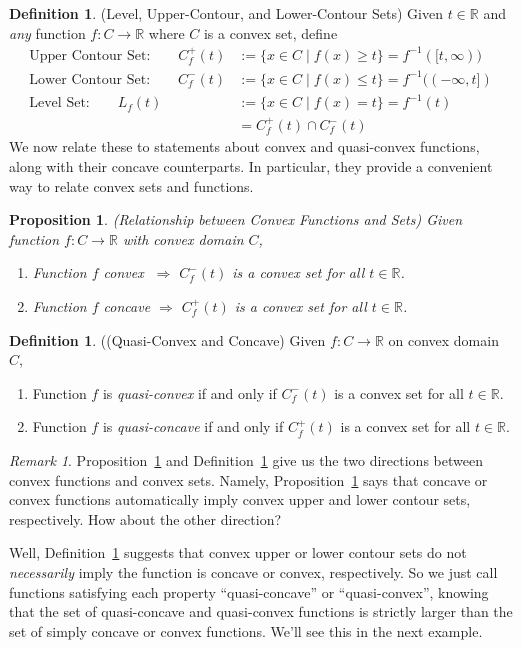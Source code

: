 \documentclass[12pt]{article}
\numberwithin{equation}{section} %
\theoremstyle{plain}
\newtheorem{prop}[thm]{Proposition}
\theoremstyle{definition}
\newtheorem{defn}[thm]{Definition}
\theoremstyle{remark}
\newtheorem*{rmk}{Remark}
\newcommand{\R}{\mathbb{R}}
\begin{document}
\begin{defn}{(Level, Upper-Contour, and Lower-Contour Sets)}
Given $t\in\R$ and \emph{any} function $f:C\rightarrow \R$ where $C$ is
a convex set, define
\begin{align*}
  \text{Upper Contour Set:}
  \qquad C_f^+(t)
  &:= \{ x\in C \; | \; f(x) \geq t\} = f^{-1}([t,\infty)) \\
  \text{Lower Contour Set:}
  \qquad C_f^-(t)
  &:= \{ x\in C \; | \; f(x) \leq t\} = f^{-1}((-\infty,t]) \\
  \text{Level Set:}
  \qquad L_f(t) \;
  &:= \{ x\in C \; | \; f(x) = t\} = f^{-1}(t) \\
  &= C^+_f(t) \cap C^-_f(t)
\end{align*}
We now relate these to statements about convex and quasi-convex
functions, along with their concave counterparts. In particular, they
provide a convenient way to relate convex sets and functions.
\end{defn}

\begin{prop}{\emph{(Relationship between Convex Functions and Sets)}}
\label{prop:convexfcnset}
Given function $f:C\rightarrow \R$ with convex domain $C$,
\begin{enumerate}
  \item Function $f$ convex $\; \Rightarrow$ $C_f^-(t)$ is a convex set
    for all $t\in\R$.
  \item Function $f$ concave $\Rightarrow$ $C_f^+(t)$ is a convex set
    for all $t\in\R$.
\end{enumerate}
\end{prop}

\begin{defn}{((Quasi-Convex and Concave)}
\label{defn:quasiconvex}
Given $f:C\rightarrow \R$ on convex domain $C$,
\begin{enumerate}
  \item Function $f$ is \emph{quasi-convex} if and only if $C^-_f(t)$ is
    a convex set for all $t\in\R$.
  \item Function $f$ is \emph{quasi-concave} if and only if $C^+_f(t)$
    is a convex set for all $t\in\R$.
\end{enumerate}
\end{defn}
\begin{rmk}
Proposition~\ref{prop:convexfcnset} and
Definition~\ref{defn:quasiconvex} give us the two directions between
convex functions and convex sets. Namely,
Proposition~\ref{prop:convexfcnset} says that concave or convex
functions automatically imply convex upper and lower contour sets,
respectively. How about the other direction?

Well, Definition~\ref{defn:quasiconvex} suggests that convex upper or
lower contour sets do not \emph{necessarily} imply the function is
concave or convex, respectively. So we just call functions satisfying
each property ``quasi-concave'' or ``quasi-convex'', knowing that the
set of quasi-concave and quasi-convex functions is strictly larger than
the set of simply concave or convex functions.  We'll see this in the
next example.
\end{rmk}
\end{document}
